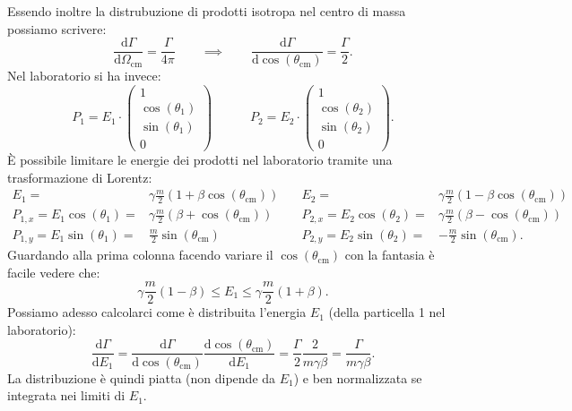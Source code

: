 Essendo inoltre la distrubuzione di prodotti isotropa nel centro di massa possiamo scrivere:
\[
	\frac{\text{d} \Gamma}{\text{d}\Omega_{\text{cm}}} = \frac{\Gamma}{4 \pi} \quad \quad \implies \quad \quad 
	\frac{\text{d} \Gamma}{\text{d}\cos\left( \theta_{\text{cm}} \right) } = \frac{\Gamma}{2}
.\] \label{eq:isotropia}
Nel laboratorio si ha invece:
\[
P_1 = E_1 \cdot 
\begin{pmatrix}
	1 \\
	\cos\left( \theta_1 \right) \\
	\sin\left( \theta_1 \right) \\
	0
\end{pmatrix} \quad \quad \quad 
P_2 = E_2\cdot
\begin{pmatrix} 
	1 \\
	\cos\left( \theta_2 \right) \\
	 \sin\left( \theta_2 \right) \\
	0
\end{pmatrix} 
.\] 
È possibile limitare le energie dei prodotti nel laboratorio tramite una trasformazione di Lorentz:
\begin{align*}
	E_1=&\gamma\frac{m}{2}\left(1+\beta\cos\left(\theta_{\text{cm}}\right)\right)&
		\quad E_2=&\gamma\frac{m}{2}\left(1-\beta\cos\left(\theta_{\text{cm}}\right)\right)\\
	P_{1,x} = E_1 \cos\left( \theta_{1} \right) =& \gamma \frac{m}{2} \left( \beta + \cos \left(\theta_{\text{cm}} \right) \right)   &
		\quad P_{2,x} = E_2 \cos\left( \theta_2 \right) =& \gamma \frac{m}{2} \left( \beta - \cos\left( \theta_{\text{cm}} \right)  \right) \\ 
	P_{1,y} = E_1 \sin\left( \theta_1 \right) =& \frac{m}{2}\sin\left( \theta_{\text{cm}}\right) &
		\quad P_{2, y} =E_2\sin\left( \theta_2 \right) =& - \frac{m}{2} \sin\left( \theta_{\text{cm}}\right) 
.\end{align*}
Guardando alla prima colonna facendo variare il $\cos\left( \theta_{\text{cm}} \right) $ con la fantasia è facile vedere che:
\[
	\gamma \frac{m}{2}\left( 1 - \beta \right) \le E_1 \le \gamma \frac{m}{2} \left( 1 + \beta \right) 
.\] 
Possiamo adesso calcolarci come è distribuita l'energia $E_1$ (della particella 1 nel laboratorio):
\[
	\frac{\mbox{d} \Gamma}{\mbox{d} E_1} = 
	\frac{\mbox{d} \Gamma}{\mbox{d} \cos\left( \theta_{\text{cm}} \right) } \frac{\mbox{d} \cos\left( \theta_{\text{cm}} \right) }{\mbox{d} E_1} =
	\frac{\Gamma}{2} \frac{2}{m \gamma \beta} = \frac{\Gamma}{m \gamma \beta}
.\] 
La distribuzione è quindi piatta (non dipende da $E_1$) e ben normalizzata se integrata nei limiti di $E_1$.\\
